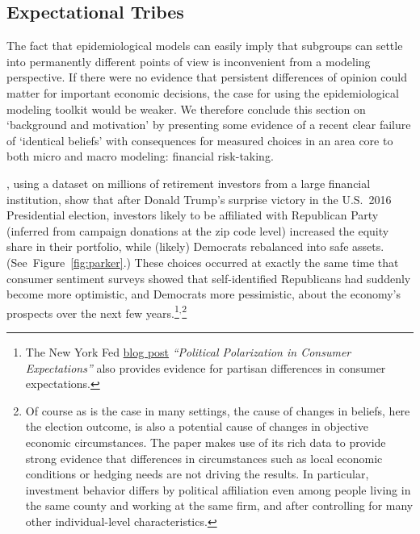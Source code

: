
\subsection{Expectational Tribes}\label{subsec:ExpTribes}

The fact that epidemiological models can easily imply that subgroups can settle into permanently different points of view is inconvenient from a modeling perspective.  If there were no evidence that persistent differences of opinion could matter for important economic decisions, the case for using the epidemiological modeling toolkit would be weaker.  We therefore conclude this section on `background and motivation' by presenting some evidence of a recent clear failure of `identical beliefs' with consequences for measured choices in an area core to both micro and macro modeling: financial risk-taking.

\href{https://github.com/iworld1991/EpiExp/blob/master/Literature/meeuwis2018belief.pdf}{\cite{meeuwis2018belief}}, using a dataset on millions of retirement investors from a large financial institution, show that after Donald Trump's surprise victory in the U.S.\ 2016 Presidential election, investors likely to be affiliated with Republican Party (inferred from  campaign donations at the zip code level) increased the equity share in their portfolio, while (likely) Democrats rebalanced into safe assets. (See~Figure~\ref{fig:parker}.)  These choices occurred at exactly the same time that consumer sentiment surveys showed that self-identified Republicans had suddenly become more optimistic, and Democrats more pessimistic, about the economy's prospects over the next few years.\footnote{The New York Fed \href{https://libertystreeteconomics.newyorkfed.org/2017/12/political-polarization-in-consumer-expectation'}{blog post} \textit{``Political Polarization in Consumer Expectations''} also provides evidence for partisan differences in consumer expectations.}$^{,}$\footnote{Of course as is the case in many settings, the cause of changes in beliefs, here the election outcome, is also a potential cause of changes in objective economic circumstances.  The paper makes use of its rich data to provide strong evidence that differences in circumstances such as local economic conditions or hedging needs are not driving the results. In particular, investment behavior differs by political affiliation even among people living in the same county and working at the same firm, and after controlling for many other individual-level characteristics.}


